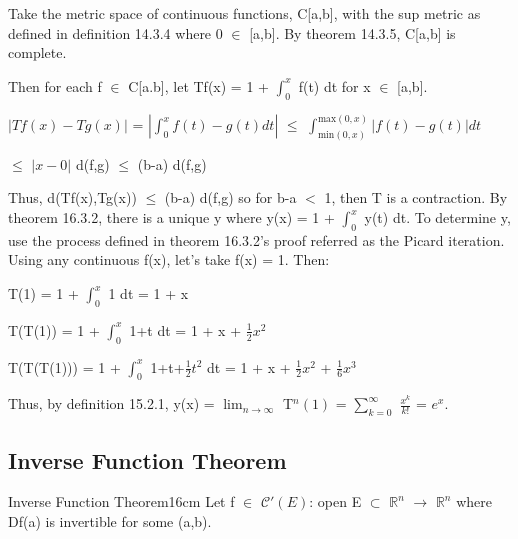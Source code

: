     \begin{tbox}
        Take the metric space of continuous functions, C[a,b],
        with the sup metric as defined in {\color{blue} definition 14.3.4}
        where 0 $\in$ [a,b].
        By {\color{red} theorem 14.3.5}, C[a,b] is complete.
        
        Then for each f $\in$ C[a.b], let Tf(x) = 1 + $\int_0^x$ f(t) dt
        for x $\in$ [a,b].
        
        \hspace{0.5cm}
        $|Tf(x) - Tg(x)|$
        = $|\int_0^x f(t)-g(t) dt|$
        $\leq$ $\int_{\text{min}(0,x)}^{\text{max}(0,x)} | f(t)-g(t) | dt$

        \hspace{3.55cm}
        $\leq$ $|x-0|$ d(f,g)
        $\leq$ (b-a) d(f,g)

        Thus, d(Tf(x),Tg(x)) $\leq$ (b-a) d(f,g) so for b-a $<$ 1, then T
        is a contraction.
        By {\color{red} theorem 16.3.2},
        there is a unique y where y(x) = 1 + $\int_0^x$ y(t) dt.
        To determine y, use the process defined in {\color{red} theorem 16.3.2}'s
        proof referred as the Picard iteration. Using any continuous f(x),
        let's take f(x) = 1. Then:

        \hspace{0.5cm}
        T(1)
        = 1 + $\int_0^x$ 1 dt
        = 1 + x

        \hspace{0.5cm}
        T(T(1))
        = 1 + $\int_0^x$ 1+t dt
        = 1 + x + $\frac{1}{2}x^2$

        \hspace{0.5cm}
        T(T(T(1)))
        = 1 + $\int_0^x$ 1+t+$\frac{1}{2}t^2$ dt
        = 1 + x + $\frac{1}{2}x^2$ + $\frac{1}{6}x^3$

        Thus, by {\color{blue} definition 15.2.1}, y(x)
        = $\lim_{n \rightarrow \infty}$ T$^n(1)$
        = $\sum_{k=0}^{\infty}$ $\frac{x^k}{k!}$ = $e^x$.
    \end{tbox}

    \newpage





\subsection{ Inverse Function Theorem }

    \begin{wtheorem}{Inverse Function Theorem}{16cm}
        Let f $\in$ $\mathscr{C}'(E)$: open E $\subset$ $\mathbb{R}^n$
        $\rightarrow$ $\mathbb{R}^n$ where Df(a) is invertible
        for some (a,b).
    \end{wtheorem}

